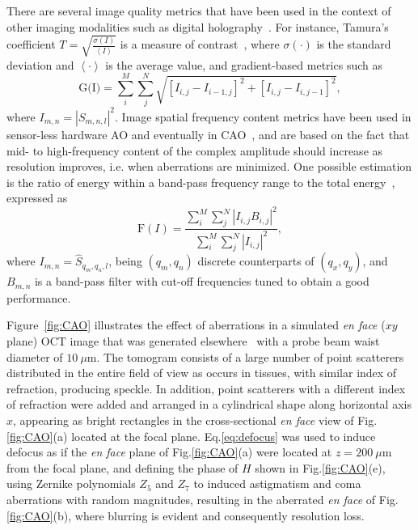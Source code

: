 There are several image quality metrics that have been used in the context of other imaging modalities such as digital holography~\cite{Trujillo2015_Comparative}. For instance, Tamura's coefficient $T = \sqrt{\frac{\sigma(I)}{\left<I\right>}}$ is a measure of contrast~\cite{Memmolo2011_Automatic}, where $\sigma(\cdot)$ is the standard deviation and $\left<\cdot\right>$ is the average value, and gradient-based metrics such as
\begin{equation}
	\text{G(I)} = \sum_i^M\sum_j^N \sqrt{\left[I_{i,j}-I_{i-1,j}\right] ^2 + \left[I_{i,j}-I_{i,j-1}\right] ^2},
\end{equation}
where $I_{m,n} = |S_{m,n,l}| ^ 2$. Image spatial frequency content metrics have been used in sensor-less hardware AO and eventually in CAO~\cite{Debarre2007_Image}, and are based on the fact that mid- to high-frequency content of the complex amplitude should increase as resolution improves, i.e. when aberrations are minimized. One possible estimation is the ratio of energy within a band-pass frequency range to the total energy~\cite{Adie2012_Computational}, expressed as
\begin{equation}
	\text{F}(I) = \frac{\sum_i^M\sum_j^N |I_{i,j}B_{i,j}|^2 }{\sum_i^M\sum_j^N |I_{i,j}|^2},
\end{equation}
where $I_{m,n} = \hat{S}_{q_m, q_n,l}$, being $(q_m, q_n)$ discrete counterparts of $(q_x, q_y)$, and $B_{m,n}$ is a band-pass filter with cut-off frequencies tuned to obtain a good performance.

Figure~\ref{fig:CAO} illustrates the effect of aberrations in a simulated \textit{en face} ($xy$ plane) OCT image that was generated elsewhere~\cite{Cuartas-Velez2017_Formacion} with a probe beam waist diameter of $10~\mu$m. The tomogram consists of a large number of point scatterers distributed in the entire field of view as occurs in tissues, with similar index of refraction, producing speckle. In addition, point scatterers with a different index of refraction were added and arranged in a cylindrical shape along horizontal axis $x$, appearing as bright rectangles in the cross-sectional \textit{en face} view of Fig.\ref{fig:CAO}(a) located at the focal plane. Eq.\eqref{eq:defocus} was used to induce defocus as if the \textit{en face} plane of Fig.\ref{fig:CAO}(a) were located at $z=200~\mu$m from the focal plane, and defining the phase of $H$ shown in Fig.\ref{fig:CAO}(e), using Zernike polynomials $Z_5$ and $Z_7$ to induced astigmatism and coma aberrations with random magnitudes, resulting in the aberrated \textit{en face} of Fig.\ref{fig:CAO}(b), where blurring is evident and consequently resolution loss.

